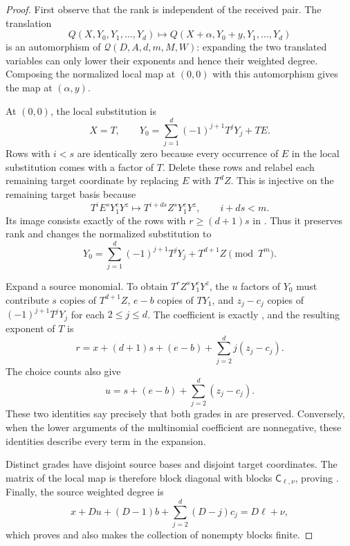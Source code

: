 \documentclass[11pt,letterpaper]{article}
\theoremstyle{definition}
\newcommand{\Qspace}{\mathcal{Q}}
\begin{document}
\begin{proof}
First observe that the rank is independent of the received pair.  The
translation
\[
  Q(X,Y_0,Y_1,\ldots,Y_d)
  \longmapsto
  Q(X+\alpha,Y_0+y,Y_1,\ldots,Y_d)
\]
is an automorphism of \(\Qspace(D,A,d,m,M,W)\): expanding the two translated
variables can only lower their exponents and hence their weighted degree.
Composing the normalized local map at \((0,0)\) with this automorphism gives
the map at \((\alpha,y)\).

At \((0,0)\), the local substitution is
\[
  X=T,
  \qquad
  Y_0=
  \sum_{j=1}^{d}(-1)^{j+1}T^jY_j+TE.
\]
Rows with $i<s$ are identically zero because every occurrence of $E$ in
the local substitution comes with a factor of $T$. Delete these rows and
relabel each remaining target coordinate by replacing \(E\) with \(T^dZ\).
This is injective on the remaining target basis because
\[
  T^iE^sY_1^eY^z
  \longmapsto
  T^{i+ds}Z^sY_1^eY^z,
  \qquad i+ds<m.
\]
Its image consists exactly of the rows with $r\ge(d+1)s$ in
. Thus it preserves rank and changes the
normalized substitution to
\begin{equation}
  Y_0=
  \sum_{j=1}^{d}(-1)^{j+1}T^jY_j+T^{d+1}Z
  \pmod{T^m}.
  \label{eq:local-block-substitution}
\end{equation}

Expand a source monomial.  To obtain
\(T^rZ^sY_1^eY^z\), the \(u\) factors of \(Y_0\) must contribute
\(s\) copies of \(T^{d+1}Z\), \(e-b\) copies of \(TY_1\), and
\(z_j-c_j\) copies of
\((-1)^{j+1}T^jY_j\) for each \(2\leq j\leq d\).  The coefficient is
exactly , and the resulting exponent of \(T\) is
\begin{equation}
  r=x+(d+1)s+(e-b)+\sum_{j=2}^{d}j(z_j-c_j).
  \label{eq:local-block-t-degree}
\end{equation}
The choice counts also give
\[
  u=s+(e-b)+\sum_{j=2}^{d}(z_j-c_j).
\]
These two identities say precisely that both grades in
 are preserved.
Conversely, when the lower arguments of the multinomial coefficient are
nonnegative, these identities describe every term in the expansion.

Distinct grades have disjoint source bases and disjoint target coordinates.
The matrix of the local map is therefore block diagonal with blocks
\(\mathsf C_{\ell,\nu}\), proving
.  Finally, the source weighted degree is
\[
  x+Du+(D-1)b+\sum_{j=2}^{d}(D-j)c_j
  =D\ell+\nu,
\]
which proves  and also makes the collection of
nonempty blocks finite.
\end{proof}
\end{document}
